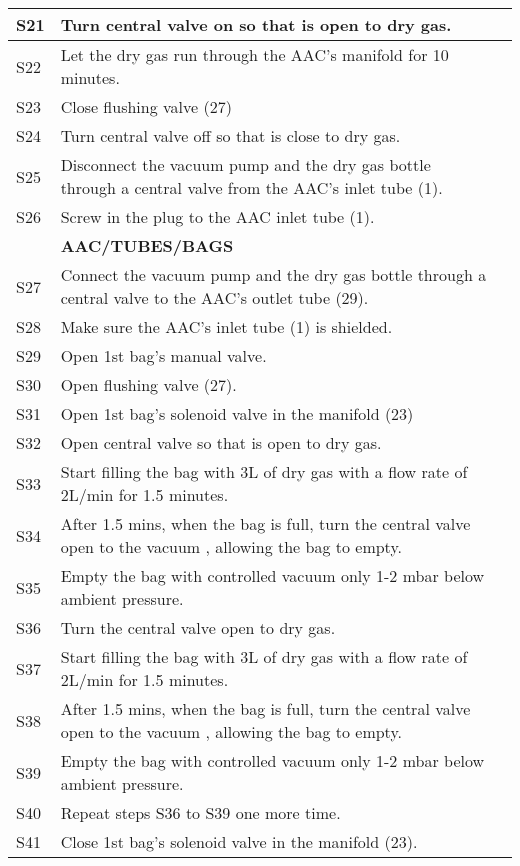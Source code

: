 \begin{longtable} {|m{}|m{}|m{}|}
S21 & Turn central valve on so that is open to dry gas. & \\ \hline
S22 & Let the dry gas run through the AAC's manifold for 10 minutes. & \\ \hline
S23 & Close flushing valve (27) & \\ \hline
S24 & Turn central valve off so that is close to dry gas. & \\ \hline
S25 & Disconnect the vacuum pump and the dry gas bottle through a central valve from the AAC's inlet tube (1). & \\ \hline
S26 & Screw in the plug to the AAC inlet tube (1). & \\ \hline
& \textbf{AAC/TUBES/BAGS} & \\ \hline
S27 & Connect the vacuum pump and the dry gas bottle through a central valve to the AAC's outlet tube (29). & \\ \hline
S28 & Make sure the AAC's inlet tube (1) is shielded. & \\ \hline
S29 & Open 1st bag's manual valve. & \\ \hline
S30 & Open flushing valve (27). & \\ \hline
S31 & Open 1st bag's solenoid valve in the manifold (23) & \\ \hline
S32 & Open central valve so that is open to dry gas. & \\ \hline
S33 & Start filling the bag with 3L of dry gas with a flow rate of 2L/min for 1.5 minutes. & \\ \hline
S34 & After 1.5 mins, when the bag is full, turn the central valve open to the vacuum , allowing the bag to empty. & \\ \hline
S35 & Empty the bag with controlled vacuum only 1-2 mbar below ambient pressure. & \\ \hline
S36 & Turn the central valve open to dry gas. & \\ \hline
S37 & Start filling the bag with 3L of dry gas with a flow rate of 2L/min for 1.5 minutes. & \\ \hline
S38 & After 1.5 mins, when the bag is full, turn the central valve open to the vacuum , allowing the bag to empty. & \\ \hline
S39 & Empty the bag with controlled vacuum only 1-2 mbar below ambient pressure. & \\ \hline
S40 & Repeat steps S36 to S39 one more time. & \\ \hline
S41 & Close 1st bag's solenoid valve in the manifold (23). & \\ \hline

\end{longtable}
